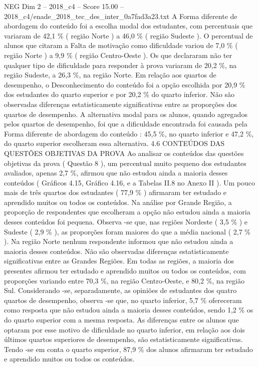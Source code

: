 \begin{textsample}{NEG Dim 2 – 2018\_c4 – Score 15.00 – 2018\_c4/enade\_2018\_tec\_des\_inter\_0a7fad3a23.txt}
A Forma diferente de abordagem do conteúdo foi a escolha modal dos estudantes, com percentuais que variaram de 42,1 \% ( região Norte ) a 46,0 \% ( região Sudeste ).
O percentual de alunos que citaram a Falta de motivação como dificuldade variou de 7,0 \% ( região Norte ) a 9,9 \% ( região Centro-Oeste ).
Os que declararam não ter qualquer tipo de dificuldade para responder à prova variaram de 20,2 \%, na região Sudeste, a 26,3 \%, na região Norte.
Em relação aos quartos de desempenho, o Desconhecimento do conteúdo foi a opção escolhida por 20,9 \% dos estudantes do quarto superior e por 20,2 \% do quarto inferior.
Não são observadas diferenças estatisticamente significativas entre as proporções dos quartos de desempenho.
A alternativa modal para os alunos, quando agregados pelos quartos de desempenho, foi que a dificuldade encontrada foi causada pela Forma diferente de abordagem do conteúdo : 45,5 \%, no quarto inferior e 47,2 \%, do quarto superior escolheram essa alternativa. 4.6 CONTEÚDOS DAS QUESTÕES OBJETIVAS DA PROVA Ao analisar os conteúdos das questões objetivas da prova ( Questão 8 ), um percentual muito pequeno dos estudantes avaliados, apenas 2,7 \%, afirmou que não estudou ainda a maioria desses conteúdos ( Gráficos 4.15, Gráfico 4.16, e a Tabelas II.8 no Anexo II ).
Um pouco mais de três quartos dos estudantes ( 77,9 \% ) afirmaram ter estudado e aprendido muitos ou todos os conteúdos.
Na análise por Grande Região, a proporção de respondentes que escolheram a opção não estudou ainda a maioria desses conteúdos foi pequena.
Observa -se que, nas regiões Nordeste ( 3,5 \% ) e Sudeste ( 2,9 \% ), as proporções foram maiores do que a média nacional ( 2,7 \% ).
Na região Norte nenhum respondente informou que não estudou ainda a maioria desses conteúdos.
Não são observadas diferenças estatisticamente significativas entre as Grandes Regiões.
Em todas as regiões, a maioria dos presentes afirmou ter estudado e aprendido muitos ou todos os conteúdos, com proporções variando entre 70,3 \%, na região Centro-Oeste, e 80,2 \%, na região Sul.
Considerando -se, separadamente, as opiniões de estudantes dos quatro quartos de desempenho, observa -se que, no quarto inferior, 5,7 \% ofereceram como resposta que não estudou ainda a maioria desses conteúdos, sendo 1,2 \% os do quarto superior com a mesma resposta.
As diferenças entre os alunos que optaram por esse motivo de dificuldade no quarto inferior, em relação aos dois últimos quartos superiores de desempenho, são estatisticamente significativas.
Tendo -se em conta o quarto superior, 87,9 \% dos alunos afirmaram ter estudado e aprendido muitos ou todos os conteúdos.

\end{textsample}
